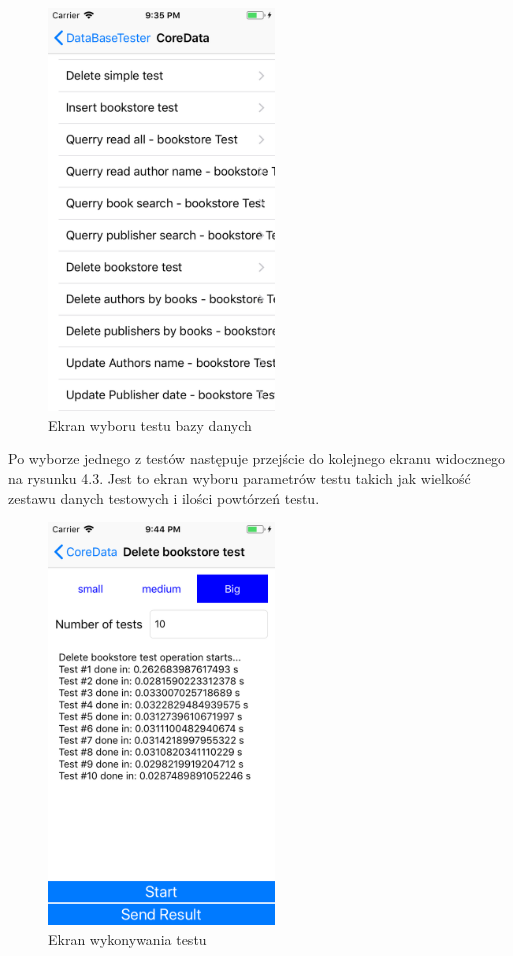 \begin{figure}[h]
\centering
	\includegraphics[width=6cm]{img/application/app-second-view.png}
	\caption{Ekran wyboru testu bazy danych}
	\label{fig: second_app_view}
\end{figure}

\newpage

Po wyborze jednego z testów następuje przejście do kolejnego ekranu widocznego na rysunku 4.3. Jest to ekran wyboru parametrów testu takich jak wielkość zestawu danych testowych i ilości powtórzeń testu. 

\begin{figure}[h]
\centering
	\includegraphics[width=6cm]{img/application/app_third-view.png}
	\caption{Ekran wykonywania testu}
	\label{fig: third_app_view}
\end{figure}

